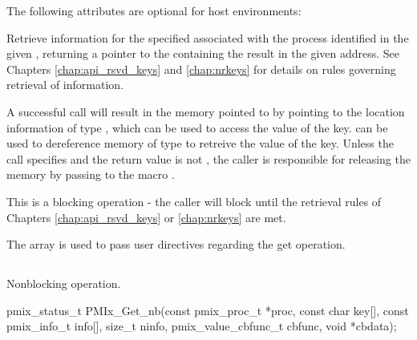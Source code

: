\reqattrend

\optattrstart
The following attributes are optional for host environments:


\optattrend

\descr

Retrieve information for the specified  associated with the process identified in the given , returning a pointer to the  containing the result in the given address. See Chapters \ref{chap:api_rsvd_keys} and \ref{chap:nrkeys} for details on rules governing retrieval of information.

A successful call will result in the memory pointed to by  pointing to the location information of type , which can be used to access the value of the key.  
can be used to dereference memory of type  to retreive the value of the key. 
Unless the call specifies  and the return value is not , the caller is responsible for releasing the memory by passing  to the macro  
.  

This is a blocking operation - the caller will block until the retrieval rules of Chapters \ref{chap:api_rsvd_keys} or \ref{chap:nrkeys} are met.

The  array is used to pass user directives regarding the get operation.

\subsection{}

\summary

Nonblocking  operation.

\format

\cspecificstart
\begin{codepar}
pmix_status_t
PMIx_Get_nb(const pmix_proc_t *proc, const char key[],
            const pmix_info_t info[], size_t ninfo,
            pmix_value_cbfunc_t cbfunc, void *cbdata);
\end{codepar}
\cspecificend

\begin{arglist}
\end{arglist}

